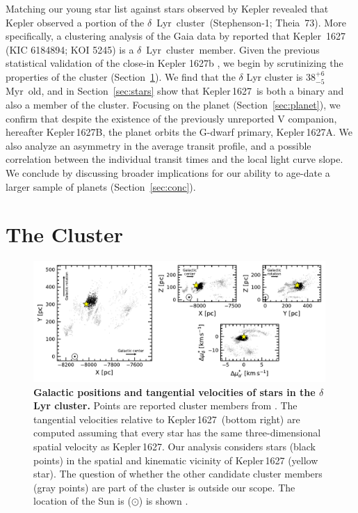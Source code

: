 \documentclass[12pt,modern,twocolumn,tighten,linenumbers]{aastex63}
\newcommand{\cn}{$\delta$\ Lyr\ cluster} %
\newcommand{\sn}{Kepler\,1627} %
\newcommand{\clusterage}{$38^{+6}_{-5}$\,Myr} %
\begin{document}
Matching our young star list against stars observed by Kepler revealed
that Kepler observed a portion of the \cn\ (Stephenson-1; Theia~73).
More specifically, a clustering analysis of the Gaia data by
\citet{KounkelCovey2019} reported that Kepler~1627 (KIC 6184894; KOI
5245) is a \cn\ member.  Given the previous statistical
validation of the close-in  Kepler 1627b
\citep{2012ApJS..199...24T,morton_false_2016,thompson_planetary_2018},
we begin by scrutinizing the properties of the cluster
(Section~\ref{sec:cluster}).  We find that the $\delta$ Lyr cluster is
\clusterage\ old, and in Section~\ref{sec:stars} show that \sn\ is
both a binary and also a member of the cluster.  Focusing on the
planet (Section~\ref{sec:planet}), we confirm that despite the
existence of the previously unreported V companion, hereafter
Kepler\,1627B, the planet orbits the G-dwarf primary, Kepler\,1627A.
We also analyze an asymmetry in the average transit profile, and a
possible correlation between the individual transit times and the
local light curve slope.  We conclude by discussing broader
implications for our ability to age-date a larger sample of planets
(Section~\ref{sec:conc}).


\section{The Cluster}
\label{sec:cluster}

\begin{figure}[t]
	\begin{center}
		\leavevmode
		\includegraphics[width=0.99\textwidth]{f1.pdf}
	\end{center}
	\vspace{-0.7cm}
	\caption{
    {\bf Galactic positions  and tangential velocities of stars in the
    $\delta$\,Lyr cluster.} Points are reported cluster members from
    \citet{KounkelCovey2019}.  The tangential velocities relative to
    \sn\ (bottom right) are computed assuming that every star has the
    same three-dimensional spatial velocity as \sn.  Our analysis
    considers stars (black points) in the spatial and kinematic
    vicinity of Kepler\,1627 (yellow star).  The question of whether
    the other candidate cluster members (gray points) are part of the
    cluster is outside our scope.  The location of the Sun is
    ($\odot$) is shown .
		\label{fig:XYZvtang}
	}
\end{figure}
\end{document}
